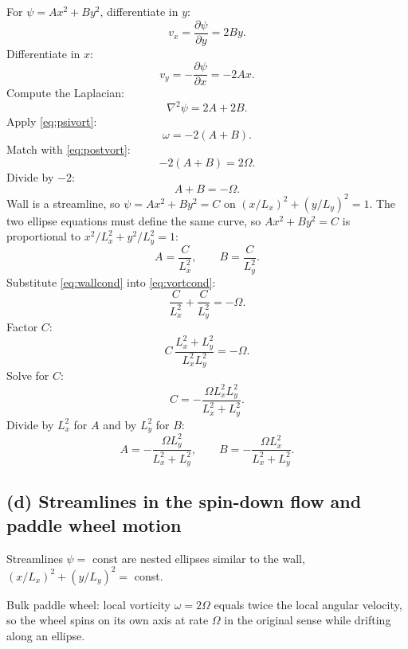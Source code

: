 \documentclass[11pt]{article}
\newcommand{\pd}[2]{\frac{\partial #1}{\partial #2}}
\newcommand{\Lap}{\nabla^{2}}
\begin{document}
For $\psi=Ax^2+By^2$, differentiate in $y$:
\[ v_x = \pd{\psi}{y} = 2By. \]
Differentiate in $x$:
\[ v_y = -\pd{\psi}{x} = -2Ax. \]
Compute the Laplacian:
\[ \Lap\psi = 2A+2B. \]
Apply \eqref{eq:psivort}:
\[ \omega = -2(A+B). \]
Match with \eqref{eq:postvort}:
\[ -2(A+B) = 2\Omega. \]
Divide by $-2$:
\[ A+B = -\Omega. \tag{i}\label{eq:vortcond}\]
Wall is a streamline, so $\psi=Ax^2+By^2=C$ on $(x/L_x)^2+(y/L_y)^2=1$. The two ellipse equations must define the same curve, so $Ax^2+By^2=C$ is proportional to $x^2/L_x^2+y^2/L_y^2=1$:
\[ A = \frac{C}{L_x^2},\qquad B = \frac{C}{L_y^2}. \tag{ii}\label{eq:wallcond}\]
Substitute \eqref{eq:wallcond} into \eqref{eq:vortcond}:
\[ \frac{C}{L_x^2}+\frac{C}{L_y^2} = -\Omega. \]
Factor $C$:
\[ C\,\frac{L_x^2+L_y^2}{L_x^2 L_y^2} = -\Omega. \]
Solve for $C$:
\[ C = -\frac{\Omega L_x^2 L_y^2}{L_x^2+L_y^2}. \]
Divide by $L_x^2$ for $A$ and by $L_y^2$ for $B$:
\begin{equation}
\boxed{\;A = -\frac{\Omega L_y^2}{L_x^2+L_y^2},\qquad B = -\frac{\Omega L_x^2}{L_x^2+L_y^2}.\;}
\label{eq:ABfinal}
\end{equation}

\subsection*{(d) Streamlines in the spin-down flow and paddle wheel motion}

Streamlines $\psi=$ const are nested ellipses similar to the wall, $(x/L_x)^2+(y/L_y)^2=$ const.
\begin{center}
\end{center}

Bulk paddle wheel: local vorticity $\omega=2\Omega$ equals twice the local angular velocity, so the wheel spins on its own axis at rate $\Omega$ in the original sense while drifting along an ellipse.
\end{document}
